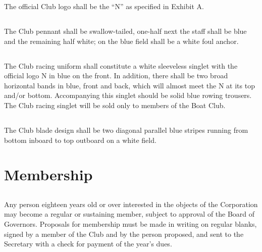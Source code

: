 \documentclass[11pt,american,letterpaper,]{constitution}
\begin{document}
The official Club logo shall be the “N” as specified in Exhibit A.

\subsection[Pennant]{} 

The Club pennant shall be swallow-tailed, one-half next the staff shall be blue and the remaining half white; on the blue field shall be a white foul anchor.

\subsection[Racing Uniform]{} 

The Club racing uniform shall constitute a white sleeveless singlet with the official logo N in blue on the front. In addition, there shall be two broad horizontal bands in blue, front and back, which will almost meet the N at its top and/or bottom. Accompanying this singlet should be solid blue rowing trousers. The Club racing singlet will be sold only to members of the Boat Club.

\subsection[Blade Design]{} 

The Club blade design shall be two diagonal parallel blue stripes running from bottom inboard to top outboard on a white field.

\section{Membership}

\subsection[Eligibility]{} 

Any person eighteen years old or over interested in the objects of the Corporation may become a regular or sustaining member, subject to approval of the Board of Governors. Proposals for membership must be made in writing on regular blanks, signed by a member of the Club and by the person proposed, and sent to the Secretary with a check for payment of the year's dues.

\subsection[Regular Members]{} 
\end{document}
